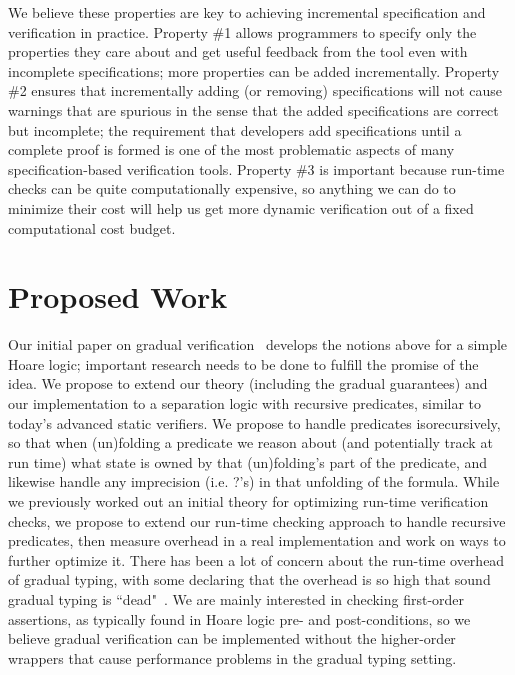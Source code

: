 \documentclass[10pt,twocolumn]{article}
\begin{document}
\begin{sloppypar}
We believe these properties are key to achieving incremental specification and verification in practice.  Property \#1 allows programmers to specify only the properties they care about and get useful feedback from the tool even with incomplete specifications; more properties can be added incrementally.  Property \#2 ensures that incrementally adding (or removing) specifications will not cause warnings that are spurious in the sense that the added specifications are correct but incomplete; the requirement that developers add specifications until a complete proof is formed is one of the most problematic aspects of many specification-based verification tools.  Property \#3 is important because run-time checks can be quite computationally expensive, so anything we can do to minimize their cost will help us get more dynamic verification out of a fixed computational cost budget.


\section{Proposed Work}
Our initial paper on gradual verification~\cite{baderAl:vmcai2018} develops the notions above for a simple Hoare logic; important research needs to be done to fulfill the promise of the idea.
We propose to extend our theory (including the gradual guarantees) and our implementation to a separation logic with recursive predicates, similar to today's advanced static verifiers.  We propose to handle predicates isorecursively, so that when (un)folding a predicate we reason about (and potentially track at run time) what state is owned by that (un)folding's part of the predicate, and likewise handle any imprecision (i.e. ?'s) in that unfolding of the formula. While we previously worked out an initial theory for optimizing run-time verification checks, we propose to extend our run-time checking approach to handle recursive predicates, then measure overhead in a real implementation and work on ways to further optimize it.  There has been a lot of concern about the run-time overhead of gradual typing, with some declaring that the overhead is so high that sound gradual typing is ``dead"~\cite{takikawaAl:popl2016}.  We are mainly interested in checking first-order assertions, as typically found in Hoare logic pre- and post-conditions, so we believe gradual verification can be implemented without the higher-order wrappers that cause performance problems in the gradual typing setting.


\end{sloppypar}
\end{document}
